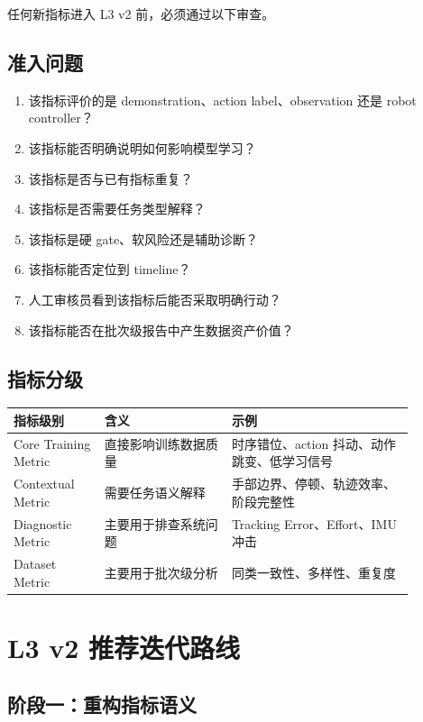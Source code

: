\documentclass[UTF8,zihao=-4,oneside,openany]{ctexrep}
\begin{document}
任何新指标进入 L3 v2 前，必须通过以下审查。

\subsection{准入问题}

\begin{enumerate}
  \item 该指标评价的是 demonstration、action label、observation 还是 robot controller？
  \item 该指标能否明确说明如何影响模型学习？
  \item 该指标是否与已有指标重复？
  \item 该指标是否需要任务类型解释？
  \item 该指标是硬 gate、软风险还是辅助诊断？
  \item 该指标能否定位到 timeline？
  \item 人工审核员看到该指标后能否采取明确行动？
  \item 该指标能否在批次级报告中产生数据资产价值？
\end{enumerate}

\subsection{指标分级}

\begin{longtable}{p{0.2\linewidth}p{0.28\linewidth}p{0.4\linewidth}}
\toprule
\textbf{指标级别} & \textbf{含义} & \textbf{示例} \\
\midrule
Core Training Metric & 直接影响训练数据质量 & 时序错位、action 抖动、动作跳变、低学习信号 \\
Contextual Metric & 需要任务语义解释 & 手部边界、停顿、轨迹效率、阶段完整性 \\
Diagnostic Metric & 主要用于排查系统问题 & Tracking Error、Effort、IMU 冲击 \\
Dataset Metric & 主要用于批次级分析 & 同类一致性、多样性、重复度 \\
\bottomrule
\end{longtable}

\section{L3 v2 推荐迭代路线}

\subsection{阶段一：重构指标语义}
\end{document}
